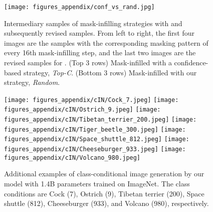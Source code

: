 \documentclass{article}
\begin{document}
\begin{figure}
\centering
\texttt{[image: figures\_appendix/conf\_vs\_rand.jpg]}
\caption{Intermediary samples of mask-infilling strategies with  and subsequently revised samples. From left to right, the first four images are the samples with the corresponding masking pattern of every 16th mask-infilling step, and the last two images are the revised samples for . (Top 3 rows) Mask-infilled with a confidence-based strategy, \emph{Top-C}. (Bottom 3 rows) Mask-infilled with our strategy, \emph{Random}.}
\label{fig:conf_vs_rand}
\end{figure}


\begin{figure}
    \centering
    \texttt{[image: figures\_appendix/cIN/Cock\_7.jpeg]}
    \texttt{[image: figures\_appendix/cIN/Ostrich\_9.jpeg]}
    \texttt{[image: figures\_appendix/cIN/Tibetan\_terrier\_200.jpeg]}
    \texttt{[image: figures\_appendix/cIN/Tiger\_beetle\_300.jpeg]}
    \texttt{[image: figures\_appendix/cIN/Space\_shuttle\_812.jpeg]}
    \texttt{[image: figures\_appendix/cIN/Cheeseburger\_933.jpeg]}
    \texttt{[image: figures\_appendix/cIN/Volcano\_980.jpeg]}
    \caption{Additional examples of class-conditional image generation by our model with 1.4B parameters trained on ImageNet. The class conditions are Cock (7), Ostrich (9), Tibetan terrier (200), Space shuttle (812), Cheeseburger (933), and Volcano (980), respectively.}
    \label{fig:appendix_cIN}
\end{figure}
\end{document}
